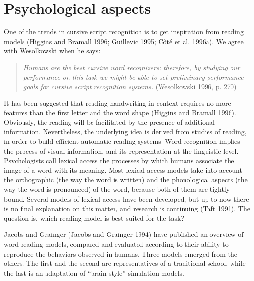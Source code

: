 \documentclass[ijdar]{svjour}
\begin{document}
\section{Psychological aspects}
\label{PWORK}

One of the trends in cursive script recognition is to get inspiration from reading models (Higgins and Bramall 1996; Guillevic 1995; C\^ot\'e et al. 1996a).
We agree with Wesolkowski when he says:

\begin{quote}
{\it Humans are the best cursive word recognizers;\break
therefore, by studying our performance on this task we might be able to set preliminary performance goals for cursive script recognition
systems.}\break
(Wesolkowski 1996, p. 270)
\end{quote}

\noindent
It has been suggested that reading handwriting in context requires no more features than the first letter and the word shape (Higgins and Bramall 1996).
Obviously, the reading will be facilitated by the presence of additional information.
Nevertheless, the underlying idea is derived from studies of reading, in order to build efficient automatic reading systems.
Word recognition implies the process of visual information, and its representation at the linguistic level.
Psychologists call lexical access the processes by which humans associate the image of a word with its meaning.
Most lexical access models take into account the orthographic (the way the word is written) and the phonological aspects (the way the word is pronounced) of the word, because both of them are tightly bound.
Several models of lexical access have been developed, but up to now there is no final explanation on this matter, and research is continuing (Taft 1991).
The question is, which reading model is best suited for the task?

Jacobs and Grainger (Jacobs and Grainger 1994)\break
have published an overview of word reading models, compared and evaluated according to their ability to reproduce the behaviors observed in humans.
Three models emerged from the others.
The first and the second are representatives of a traditional school, while the last is an adaptation of ``brain-style'' simulation models.
\end{document}
